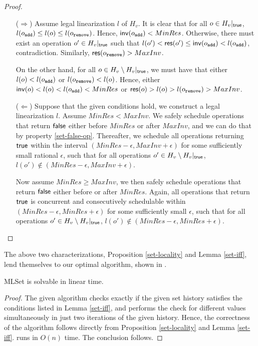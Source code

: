 \begin{proof}
\begin{itemize}
    \item[($\Rightarrow$)]
    Assume legal linearization $l$ of $H_v$. It is clear that for all $o\in H_v|_{\sf true}$, $l(o_{\tt add}) \leq l(o) \leq l(o_{\tt remove})$. Hence, ${\sf inv}(o_{\tt add}) < MinRes$. Otherwise, there must exist an operation $o' \in H_v|_{\sf true}$ such that $l(o') < {\sf res}(o') \leq {\sf inv}(o_{\tt add}) < l(o_{\tt add})$, contradiction. Similarly, ${\sf res}(o_{\tt remove}) > MaxInv$.

    On the other hand, for all $o\in H_v \setminus H_v|_{\sf true}$, we must have that either $l(o) < l(o_{\tt add})$ or $l(o_{\tt remove}) < l(o)$. Hence, either ${\sf inv}(o) < l(o) < l(o_{\tt add}) < MinRes$ or ${\sf res}(o) > l(o) > l(o_{\tt remove}) > MaxInv$.
    
    \item[($\Leftarrow$)]
    Suppose that the given conditions hold, we construct a legal linearization $l$. Assume $MinRes < MaxInv$. We safely schedule operations that return ${\sf false}$ either before $MinRes$ or after $MaxInv$, and we can do that by property \ref{set-false-op}. Thereafter, we schedule all operations returning ${\sf true}$ within the interval $(MinRes - \epsilon, MaxInv + \epsilon)$ for some sufficiently small rational $\epsilon$, such that for all operations $o' \in H_v \setminus H_v|_{\sf true}$, $l(o') \notin (MinRes - \epsilon, MaxInv + \epsilon)$.
    
    Now assume $MinRes \geq MaxInv$, we then safely schedule operations that return ${\sf false}$ either before or after $MinRes$. Again, all operations that return ${\sf true}$ is concurrent and consecutively schedulable within $(MinRes - \epsilon, MinRes + \epsilon)$ for some sufficiently small $\epsilon$, such that for all operations $o' \in H_v \setminus H_v|_{\sf true}$, $l(o') \notin (MinRes - \epsilon, MinRes + \epsilon)$.
\end{itemize}
\end{proof}

The above two characterizations, Proposition \ref{set-locality} and Lemma \ref{set-iff}, lend themselves to our optimal algorithm, shown in .



\begin{theorem}
    MLSet is solvable in linear time.
\end{theorem}

\begin{proof}
The given algorithm checks exactly if the given set history satisfies the conditions listed in Lemma \ref{set-iff}, and performs the check for different values simultaneously in just two iterations of the given history. Hence, the correctness of the algorithm follows directly from Proposition \ref{set-locality} and Lemma \ref{set-iff}.  runs in $O(n)$ time. The conclusion follows.
\end{proof}